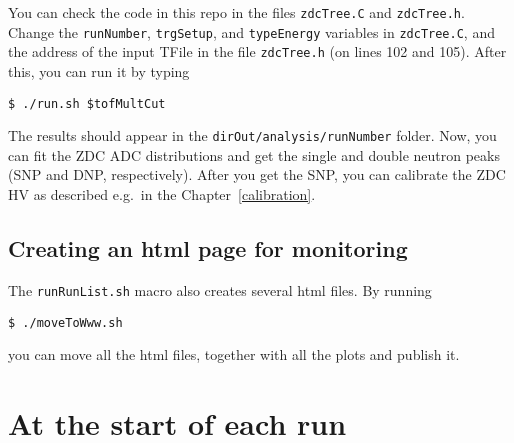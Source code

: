You can check the code in this repo in the files
\texttt{zdcTree.C} and \texttt{zdcTree.h}. Change the \texttt{runNumber}, \texttt{trgSetup},
and \texttt{typeEnergy} variables in \texttt{zdcTree.C}, and
the address of the input TFile in the file \texttt{zdcTree.h} (on lines 102 and 105). After this, you can run it by
typing
\begin{verbatim}
$ ./run.sh $tofMultCut
\end{verbatim}
The results should appear in the \texttt{dirOut/analysis/runNumber} folder. Now, you can fit the ZDC ADC distributions
and get the single and double neutron peaks (SNP and DNP, respectively). After you get the SNP, you can calibrate
the ZDC HV as described e.g.\ in the Chapter~\ref{calibration}.

\subsection{Creating an html page for monitoring}\hypertarget{creating-html-page-for-monitoring}{}\label{creating-html-page-for-monitoring}

The \texttt{runRunList.sh} macro also creates several html files. By running
\begin{verbatim}
$ ./moveToWww.sh
\end{verbatim}
you can move all the html files, together with all the plots and publish it.

\section{At the start of each run}